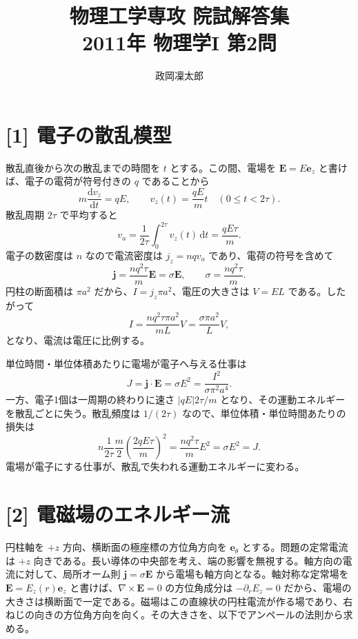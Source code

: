 \documentclass[11pt,a4paper]{article}
\title{物理工学専攻 院試解答集\\2011年 物理学I 第2問}
\author{政岡凜太郎}
\date{}
\begin{document}
\maketitle

\section*{[1] 電子の散乱模型}
散乱直後から次の散乱までの時間を $t$ とする。この間、電場を $\boldsymbol{E}=E\boldsymbol{e}_z$ と書けば、電子の電荷が符号付きの $q$ であることから
\begin{equation}
  m\frac{\mathrm{d}v_z}{\mathrm{d}t}=qE,\qquad
  v_z(t)=\frac{qE}{m}t\quad(0\le t<2\tau).
\end{equation}
散乱周期 $2\tau$ で平均すると
\begin{equation}
  \boxed{v_a=\frac{1}{2\tau}\int_0^{2\tau}v_z(t)\,\mathrm{d}t
  =\frac{qE\tau}{m}.}
\end{equation}
電子の数密度は $n$ なので電流密度は $j_z=nqv_a$ であり、電荷の符号を含めて
\begin{equation}
  \boldsymbol{j}=\frac{nq^2\tau}{m}\boldsymbol{E}=\sigma\boldsymbol{E},
  \qquad \boxed{\sigma=\frac{nq^2\tau}{m}}.
\end{equation}
円柱の断面積は $\pi a^2$ だから、$I=j_z\pi a^2$、電圧の大きさは $V=EL$ である。したがって
\begin{equation}
  I=\frac{nq^2\tau\pi a^2}{mL}V=\frac{\sigma\pi a^2}{L}V,
\end{equation}
となり、電流は電圧に比例する。

単位時間・単位体積あたりに電場が電子へ与える仕事は
\begin{equation}
  J=\boldsymbol{j}\cdot\boldsymbol{E}=\sigma E^2
  =\boxed{\frac{I^2}{\sigma\pi^2a^4}}.
\end{equation}
一方、電子1個は一周期の終わりに速さ $|qE|2\tau/m$ となり、その運動エネルギーを散乱ごとに失う。散乱頻度は $1/(2\tau)$ なので、単位体積・単位時間あたりの損失は
\begin{equation}
  n\frac{1}{2\tau}\frac{m}{2}\left(\frac{2qE\tau}{m}\right)^2
  =\frac{nq^2\tau}{m}E^2=\sigma E^2=J.
\end{equation}
電場が電子にする仕事が、散乱で失われる運動エネルギーに変わる。

\section*{[2] 電磁場のエネルギー流}
円柱軸を $+z$ 方向、横断面の極座標の方位角方向を $\boldsymbol{e}_\theta$ とする。問題の定常電流は $+z$ 向きである。長い導体の中央部を考え、端の影響を無視する。軸方向の電流に対して、局所オーム則 $\boldsymbol{j}=\sigma\boldsymbol{E}$ から電場も軸方向となる。軸対称な定常場を $\boldsymbol{E}=E_z(r)\boldsymbol{e}_z$ と書けば、$\nabla\times\boldsymbol{E}=0$ の方位角成分は $-\partial_rE_z=0$ だから、電場の大きさは横断面で一定である。磁場はこの直線状の円柱電流が作る場であり、右ねじの向きの方位角方向を向く。その大きさを、以下でアンペールの法則から求める。
\end{document}
